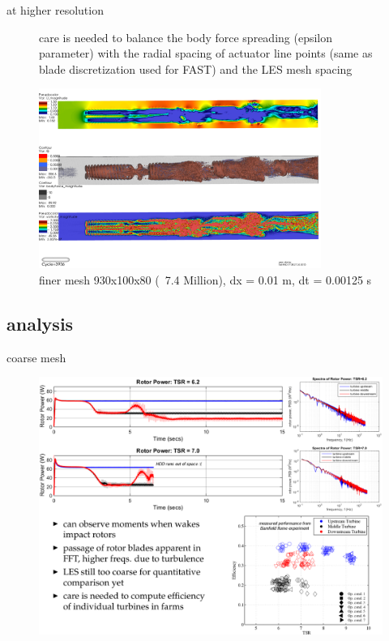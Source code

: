 \documentclass[xcolor=x11names,compress]{beamer}
\begin{document}
	\begin{frame}{at higher resolution}

		\begin{figure}[p]
		    \centering
    		
    		\small care is needed to balance the body force spreading (epsilon parameter) with the 
    		radial spacing of actuator line points (same as blade discretization used for FAST)
    		and the LES mesh spacing

			\includegraphics[width=0.82\textwidth]{figures/fastFlume__Turbines=3_TSR=6p2_Layout=offset_Mesh=fine_v0002.png}
		    \caption{\scriptsize{finer mesh 930x100x80 (~7.4 Million), dx = 0.01 m, dt = 0.00125 s}}

		\end{figure}

	\end{frame}

\subsection{analysis}
	
	\begin{frame}{coarse mesh}
		
		\vspace{-20pt}

		\begin{figure}[p]
		    \centering
		    \includegraphics[width=1.08\textwidth]{figures/Analysis_Slide_coarse-mesh.png}
		\end{figure}

	\end{frame}
\end{document}
